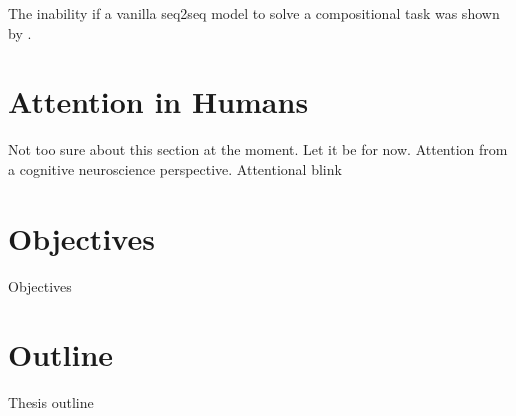 The inability if a vanilla seq2seq model to solve a compositional task was shown by \cite{Liska2018}.

\section{Attention in Humans}
Not too sure about this section at the moment. Let it be for now. Attention from a cognitive neuroscience perspective. Attentional blink

		
\section{Objectives}
	Objectives

	
\section{Outline}
	Thesis outline

				